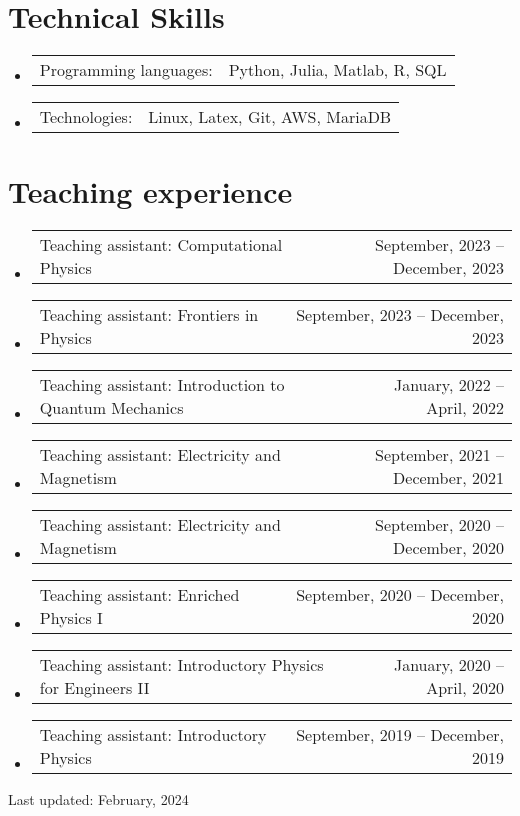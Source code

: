 \documentclass[letterpaper,11pt]{article}
\makeatletter
\newcommand{\TeachingItem}[2]{
	\item{\vspace{-1pt}
		\begin{tabular*}{0.92\textwidth}{l@{\extracolsep{\fill}}r}
			{#1} & {#2}
		\end{tabular*}
		\vspace{-5pt}
	}
}
\newcommand{\SkillsItem}[2]{
	\item{\vspace{-1pt}
		\begin{tabular*}{0.97\textwidth}{l l}
			{#1:} & {#2}
		\end{tabular*}
		\vspace{-5pt}
	}
}
\makeatother
\begin{document}
\section*{Technical Skills}
\begin{itemize}[leftmargin=*]
	\SkillsItem{Programming languages}{Python, Julia, Matlab, R, SQL}
	\SkillsItem{Technologies}{Linux, Latex, Git, AWS, MariaDB}
\end{itemize}

\section*{Teaching experience}
\begin{itemize}[leftmargin=*]
	\TeachingItem{Teaching assistant: Computational Physics}{September, 2023 -- December, 2023}
	\TeachingItem{Teaching assistant: Frontiers in Physics}{September, 2023 -- December, 2023}
	\TeachingItem{Teaching assistant: Introduction to Quantum Mechanics}{January, 2022 -- April, 2022}
	\TeachingItem{Teaching assistant: Electricity and Magnetism}{September, 2021 -- December, 2021}
	\TeachingItem{Teaching assistant: Electricity and Magnetism}{September, 2020 -- December, 2020}
	\TeachingItem{Teaching assistant: Enriched Physics I}{September, 2020 -- December, 2020}
	\TeachingItem{Teaching assistant: Introductory Physics for Engineers II}{January, 2020 -- April, 2020}
	\TeachingItem{Teaching assistant: Introductory Physics}{September, 2019 -- December, 2019}
\end{itemize}

\vspace{1cm}

\begin{flushright}
	Last updated: February, 2024
\end{flushright}
\end{document}
